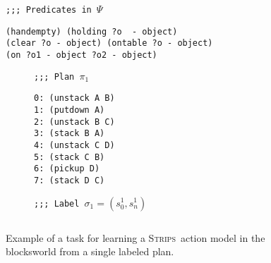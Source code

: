 \documentclass{article}
\newcommand{\strips}{\textsc{Strips}}     %
\begin{document}
\begin{figure}
{\tt ;;; Predicates in $\Psi$}
\begin{footnotesize}
\begin{verbatim}
(handempty) (holding ?o  - object)
(clear ?o - object) (ontable ?o - object)
(on ?o1 - object ?o2 - object)
\end{verbatim}
\end{footnotesize}

\vspace{0.2cm}

\begin{subfigure}{.25\textwidth}
{\tt ;;; Plan $\pi_1$}
\begin{footnotesize}
\begin{verbatim}
0: (unstack A B)
1: (putdown A)
2: (unstack B C)
3: (stack B A)
4: (unstack C D)
5: (stack C B)
6: (pickup D)
7: (stack D C)
\end{verbatim}
\end{footnotesize}
\end{subfigure}%
\begin{subfigure}{.6\textwidth}
{\tt ;;; Label $\sigma_1=(s_0^1,s_{n}^1)$}
\begin{lstlisting}[mathescape]
\end{lstlisting}
\vspace{0.1cm}
\vspace{0.6cm}
\end{subfigure}%
 \caption{\small Example of a task for learning a \strips\ action model in the blocksworld from a single labeled plan.}
\label{fig:lexample}
\end{figure}
\end{document}
